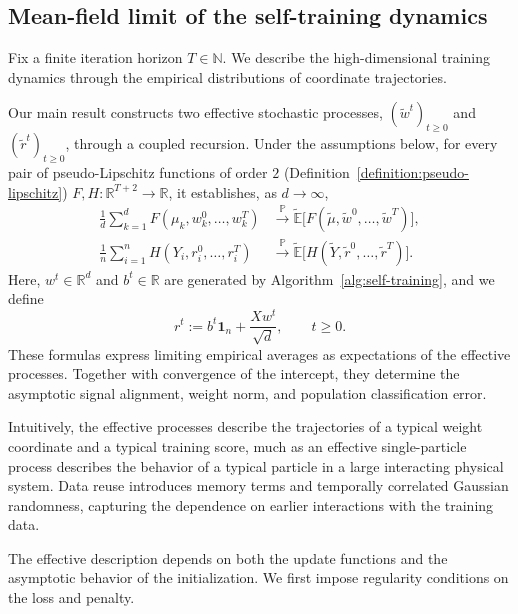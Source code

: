 \subsection{Mean-field limit of the self-training dynamics}
\label{subsec:mean-field}

Fix a finite iteration horizon $T\in\mathbb N$.
We describe the high-dimensional training dynamics through the
empirical distributions of coordinate trajectories.

Our main result constructs two effective stochastic processes,
$(\tilde w^t)_{t\geq0}$ and $(\tilde r^t)_{t\geq0}$,
through a coupled recursion.
Under the assumptions below, for every pair of
pseudo-Lipschitz functions of order $2$
(Definition~\ref{definition:pseudo-lipschitz})
$F,H:\mathbb R^{T+2}\to\mathbb R$, it establishes,
as $d\to\infty$,
\begin{align*}
    \frac1d\sum_{k=1}^d
        F(\mu_k,w_k^0,\ldots,w_k^T)
    &\xrightarrow{\mathbb P}
    \tilde{\mathbb E}
    \bigl[F(\tilde\mu,\tilde w^0,\ldots,\tilde w^T)\bigr],
    \\
    \frac1n\sum_{i=1}^n
        H(Y_i,r_i^0,\ldots,r_i^T)
    &\xrightarrow{\mathbb P}
    \tilde{\mathbb E}
    \bigl[H(\tilde Y,\tilde r^0,\ldots,\tilde r^T)\bigr].
\end{align*}
Here, $w^t\in\mathbb R^d$ and $b^t\in\mathbb R$ are generated
by Algorithm~\ref{alg:self-training}, and we define
\[
    r^t:=b^t\mathbf1_n+\frac{Xw^t}{\sqrt d},
    \qquad t\geq0.
\]
These formulas express limiting empirical averages as expectations
of the effective processes. Together with convergence of the
intercept, they determine the asymptotic signal alignment,
weight norm, and population classification error.

Intuitively, the effective processes describe the trajectories
of a typical weight coordinate and a typical training score,
much as an effective single-particle process describes the behavior
of a typical particle in a large interacting physical system.
Data reuse introduces memory terms and temporally correlated
Gaussian randomness, capturing the dependence on earlier
interactions with the training data.

The effective description depends on both the update functions
and the asymptotic behavior of the initialization.
We first impose regularity conditions on the loss and penalty.


